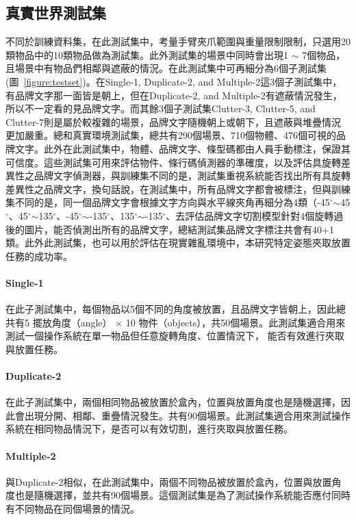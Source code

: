 \subsection{真實世界測試集}
不同於訓練資料集，在此測試集中，考量手臂夾爪範圍與重量限制限制，只選用20類物品中的10類物品做為測試集。此外測試集的場景中同時會出現1 $\sim$ 7個物品，且場景中有物品們相鄰與遮蔽的情況。在此測試集中可再細分為6個子測試集(圖~\ref{figure:testset})。在Single-1, Duplicate-2, and Multiple-2這3個子測試集中，有品牌文字那一面皆是朝上，但在Duplicate-2, and Multiple-2有遮蔽情況發生，所以不一定看的見品牌文字。而其餘3個子測試集Clutter-3, Clutter-5, and Clutter-7則是屬於較複雜的場景，品牌文字隨機朝上或朝下，且遮蔽與堆疊情況更加嚴重。總和真實環境測試集，總共有290個場景、710個物體、476個可視的品牌文字。此外在此測試集中，物體、品牌文字、條型碼都由人員手動標注，保證其可信度。這些測試集可用來評估物件、條行碼偵測器的準確度，以及評估具旋轉差異性之品牌文字偵測器，與訓練集不同的是，測試集重視系統能否找出所有具旋轉差異性之品牌文字，換句話說，在測試集中，所有品牌文字都會被標注，但與訓練集不同的是，同一個品牌文字會根據文字方向與水平線夾角再細分為4類（-45$^{\circ}$$\sim$45$^{\circ}$、45$^{\circ}$$\sim$135$^{\circ}$、-45$^{\circ}$$\sim$-135$^{\circ}$、135$^{\circ}$$\sim$-135$^{\circ}$、去評估品牌文字切割模型針對4個旋轉過後的圖片，能否偵測出所有的品牌文字，總結測試集品牌文字標注共會有40+1類。此外此測試集，也可以用於評估在現實雜亂環境中，本研究特定姿態夾取放置任務的成功率。

\paragraph{Single-1}
在此子測試集中，每個物品以5個不同的角度被放置，且品牌文字皆朝上，因此總共有5 擺放角度（angle） $\times$ 10 物件（objects），共50個場景。此測試集適合用來測試一個操作系統在單一物品但任意旋轉角度、位置情況下， 能否有效進行夾取與放置任務。

\paragraph{Duplicate-2}
在此子測試集中，兩個相同物品被放置於盒內，位置與放置角度也是隨機選擇，因此會出現分開、相鄰、重疊情況發生。共有90個場景。此測試集適合用來測試操作系統在相同物品情況下，是否可以有效切割，進行夾取與放置任務。

\paragraph{Multiple-2}
與Duplicate-2相似，在此測試集中，兩個不同物品被放置於盒內，位置與放置角度也是隨機選擇，並共有90個場景。這個測試集是為了測試操作系統能否應付同時有不同物品在同個場景的情況。

